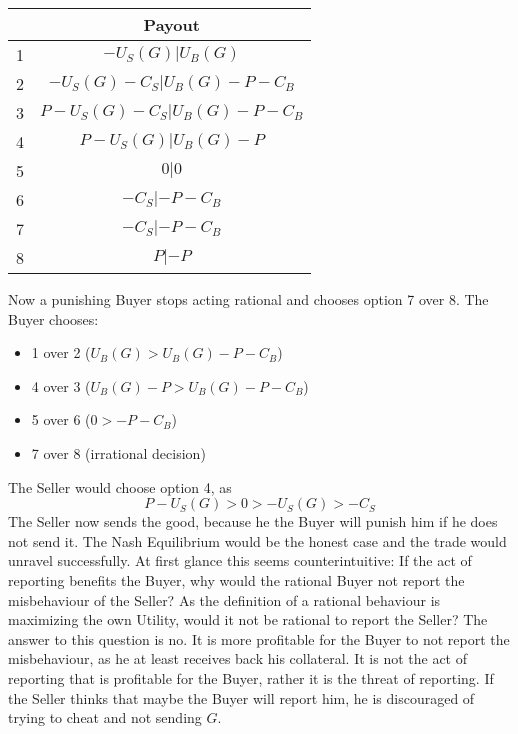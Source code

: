 \documentclass{cacthesis}
\begin{document}
\begin{center}
\begin{tabular}{ |c|c| }
\hline
& Payout  \\
\hline
\hline
1& $-U_S(G) | U_B(G)$\\
\hline
2& $-U_S(G) - C_S| U_B(G)- P - C_B $\\
\hline
3&$P-U_S(G) - C_S | U_B(G) -P - C_B$ \\
\hline
4& $P-U_S(G)| U_B(G)-P$\\
\hline
5& $0|0$\\
\hline 
6& $-C_S |-P - C_B$\\
\hline
7& $- C_S| -P-C_B$\\
\hline
8& $P| -P$\\
\hline
\end{tabular}
\end{center}
Now a punishing Buyer stops acting rational and chooses option 7 over 8.\newline
The Buyer chooses:
\begin{itemize}
    \item 1 over 2 ($U_B(G) > U_B(G) -P -C_B$)
    \item 4 over 3 ($U_B(G) - P > U_B(G) -P -C_B$)
    \item 5 over 6 ($0 > -P -C_B$)
    \item 7 over 8 (irrational decision)
\end{itemize}
The Seller would choose option 4, as 
\[P-U_S(G)>0>-U_S(G)>-C_S\]
The Seller now sends the good, because he the Buyer will punish him if he does not send it.
The Nash Equilibrium would be the honest case and the trade would unravel successfully.\newline
At first glance this seems counterintuitive: If the act of reporting benefits the Buyer, why would the rational Buyer not report the misbehaviour of the Seller? As the definition of a rational behaviour is maximizing the own Utility, would it not be rational to report the Seller?\newline
The answer to this question is no. It is more profitable for the Buyer to not report the misbehaviour, as he at least receives back his collateral.\newline
It is not the act of reporting that is profitable for the Buyer, rather it is the threat of reporting. If the Seller thinks that maybe the Buyer will report him, he is discouraged of trying to cheat and not sending $G$.\newline
\end{document}
